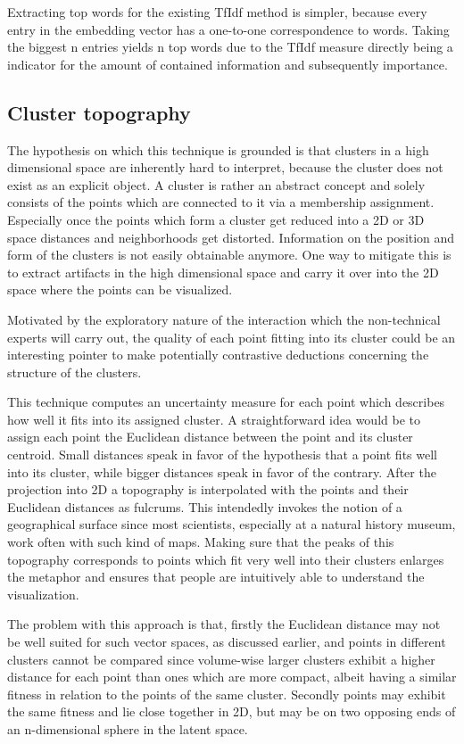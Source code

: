 Extracting top words for the existing TfIdf method is simpler, because every entry in the embedding vector has a one-to-one correspondence to words. Taking the biggest n entries yields n top words due to the TfIdf measure directly being a indicator for the amount of contained information and subsequently importance.

\subsection{Cluster topography }

The hypothesis on which this technique is grounded is that clusters in a high dimensional space are inherently hard to interpret, because the cluster does not exist as an explicit object. A cluster is rather an abstract concept and solely consists of the points which are connected to it via a membership assignment. Especially once the points which form a cluster get reduced into a 2D or 3D space distances and neighborhoods get distorted. Information on the position and form of the clusters is not easily obtainable anymore. One way to mitigate this is to extract artifacts in the high dimensional space and carry it over into the 2D space where the points can be visualized.

Motivated by the exploratory nature of the interaction which the non-technical experts will carry out, the quality of each point fitting into its cluster could be an interesting pointer to make potentially contrastive deductions concerning the structure of the clusters.

This technique computes an uncertainty measure for each point which describes how well it fits into its assigned cluster. A straightforward idea would be to assign each point the Euclidean distance between the point and its cluster centroid. Small distances speak in favor of the hypothesis that a point fits well into its cluster, while bigger distances speak in favor of the contrary. After the projection into 2D a topography is interpolated with the points and their Euclidean distances as fulcrums. This intendedly invokes the notion of a geographical surface since most scientists, especially at a natural history museum, work often with such kind of maps. Making sure that the peaks of this topography corresponds to points which fit very well into their clusters enlarges the metaphor and ensures that people are intuitively able to understand the visualization. 

The problem with this approach is that, firstly the Euclidean distance may not be well suited for such vector spaces, as discussed earlier, and points in different clusters cannot be compared since volume-wise larger clusters exhibit a higher distance for each point than ones which are more compact, albeit having a similar fitness in relation to the points of the same cluster. Secondly points may exhibit the same fitness and lie close together in 2D, but may be on two opposing ends of an n-dimensional sphere in the latent space. 

